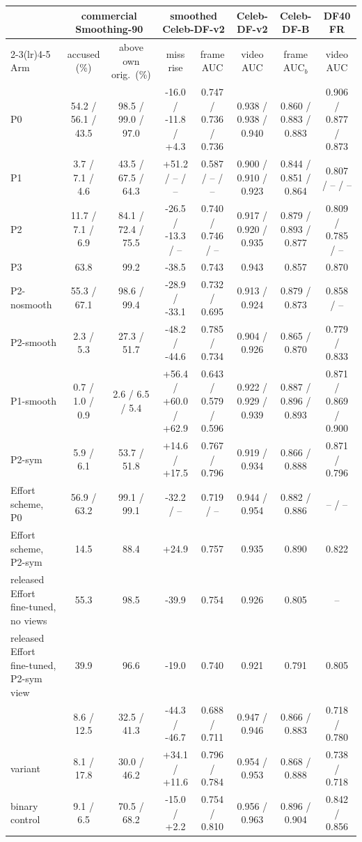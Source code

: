 \begin{tabular}{@{}l cc cc c c c@{}}
\toprule
 & \multicolumn{2}{c}{commercial Smoothing-90} & \multicolumn{2}{c}{smoothed Celeb-DF-v2} & Celeb-DF-v2 & Celeb-DF-B & DF40 FR \\
\cmidrule(lr){2-3}\cmidrule(lr){4-5}
Arm & accused (\%) & above own orig.\ (\%) & miss rise & frame AUC & video AUC & frame AUC$_b$ & video AUC \\
\midrule
P0 & 54.2 / 56.1 / 43.5 & 98.5 / 99.0 / 97.0 & -16.0 / -11.8 / +4.3 & 0.747 / 0.736 / 0.736 & 0.938 / 0.938 / 0.940 & 0.860 / 0.883 / 0.883 & 0.906 / 0.877 / 0.873 \\
P1 & 3.7 / 7.1 / 4.6 & 43.5 / 67.5 / 64.3 & +51.2 / -- / -- & 0.587 / -- / -- & 0.900 / 0.910 / 0.923 & 0.844 / 0.851 / 0.864 & 0.807 / -- / -- \\
P2 & 11.7 / 7.1 / 6.9 & 84.1 / 72.4 / 75.5 & -26.5 / -13.3 / -- & 0.740 / 0.746 / -- & 0.917 / 0.920 / 0.935 & 0.879 / 0.893 / 0.877 & 0.809 / 0.785 / -- \\
P3 & 63.8 & 99.2 & -38.5 & 0.743 & 0.943 & 0.857 & 0.870 \\
P2-nosmooth & 55.3 / 67.1 & 98.6 / 99.4 & -28.9 / -33.1 & 0.732 / 0.695 & 0.913 / 0.924 & 0.879 / 0.873 & 0.858 / -- \\
P2-smooth & 2.3 / 5.3 & 27.3 / 51.7 & -48.2 / -44.6 & 0.785 / 0.734 & 0.904 / 0.926 & 0.865 / 0.870 & 0.779 / 0.833 \\
P1-smooth & 0.7 / 1.0 / 0.9 & 2.6 / 6.5 / 5.4 & +56.4 / +60.0 / +62.9 & 0.643 / 0.579 / 0.596 & 0.922 / 0.929 / 0.939 & 0.887 / 0.896 / 0.893 & 0.871 / 0.869 / 0.900 \\
P2-sym & 5.9 / 6.1 & 53.7 / 51.8 & +14.6 / +17.5 & 0.767 / 0.796 & 0.919 / 0.934 & 0.866 / 0.888 & 0.871 / 0.796 \\
Effort scheme, P0 & 56.9 / 63.2 & 99.1 / 99.1 & -32.2 / -- & 0.719 / -- & 0.944 / 0.954 & 0.882 / 0.886 & -- / -- \\
Effort scheme, P2-sym & 14.5 & 88.4 & +24.9 & 0.757 & 0.935 & 0.890 & 0.822 \\
released Effort fine-tuned, no views & 55.3 & 98.5 & -39.9 & 0.754 & 0.926 & 0.805 & -- \\
released Effort fine-tuned, P2-sym view & 39.9 & 96.6 & -19.0 & 0.740 & 0.921 & 0.791 & 0.805 \\
\ours{} & 8.6 / 12.5 & 32.5 / 41.3 & -44.3 / -46.7 & 0.688 / 0.711 & 0.947 / 0.946 & 0.866 / 0.883 & 0.718 / 0.780 \\
\ours{} variant & 8.1 / 17.8 & 30.0 / 46.2 & +34.1 / +11.6 & 0.796 / 0.784 & 0.954 / 0.953 & 0.868 / 0.888 & 0.738 / 0.718 \\
binary control & 9.1 / 6.5 & 70.5 / 68.2 & -15.0 / +2.2 & 0.754 / 0.810 & 0.956 / 0.963 & 0.896 / 0.904 & 0.842 / 0.856 \\
\bottomrule
\end{tabular}
